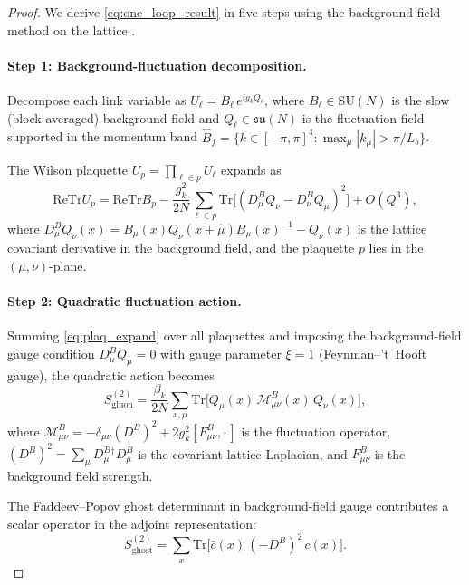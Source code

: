 \documentclass[11pt,a4paper]{amsart}
\theoremstyle{definition}
\newcommand{\SU}{\mathrm{SU}}
\newcommand{\su}{\mathfrak{su}}
\newcommand{\re}{\mathrm{Re}}
\newcommand{\Tr}{\mathrm{Tr}}
\begin{document}
\begin{proof}
We derive \eqref{eq:one_loop_result} in five steps using the background-field
method on the lattice \cite{Abbott81}.

\paragraph{Step 1: Background-fluctuation decomposition.}
Decompose each link variable as $U_\ell = B_\ell\, e^{ig_k Q_\ell}$, where
$B_\ell \in \SU(N)$ is the slow (block-averaged) background field and
$Q_\ell \in \su(N)$ is the fluctuation field supported in the
momentum band $\hat{B}_f = \{k\in[-\pi,\pi]^4 : \max_\mu |k_\mu| > \pi/L_b\}$.

The Wilson plaquette $U_p = \prod_{\ell\in p} U_\ell$ expands as
\begin{equation}\label{eq:plaq_expand}
  \re\Tr U_p = \re\Tr B_p
  - \frac{g_k^2}{2N}\sum_{\ell\in p}
    \Tr\!\bigl[(D^B_\mu Q_\nu - D^B_\nu Q_\mu)^2\bigr]
  + O(Q^3),
\end{equation}
where $D^B_\mu Q_\nu(x) = B_\mu(x) Q_\nu(x+\hat\mu) B_\mu(x)^{-1} - Q_\nu(x)$
is the lattice covariant derivative in the background field, and the plaquette
$p$ lies in the $(\mu,\nu)$-plane.

\paragraph{Step 2: Quadratic fluctuation action.}
Summing \eqref{eq:plaq_expand} over all plaquettes and imposing the
background-field gauge condition $D^B_\mu Q_\mu = 0$ with gauge parameter
$\xi = 1$ (Feynman--'t~Hooft gauge), the quadratic action becomes
\begin{equation}\label{eq:S2_gluon}
  S^{(2)}_{\mathrm{gluon}} = \frac{\beta_k}{2N}\sum_{x,\mu}
  \Tr\bigl[Q_\mu(x)\,\mathcal{M}^B_{\mu\nu}(x)\,Q_\nu(x)\bigr],
\end{equation}
where $\mathcal{M}^B_{\mu\nu} = -\delta_{\mu\nu}(D^B)^2 + 2g_k^2 [F^B_{\mu\nu},\cdot\,]$
is the fluctuation operator, $(D^B)^2 = \sum_\mu D^B_\mu{}^\dagger D^B_\mu$
is the covariant lattice Laplacian, and $F^B_{\mu\nu}$ is the
background field strength.

The Faddeev--Popov ghost determinant in background-field gauge contributes
a scalar operator in the adjoint representation:
\begin{equation}\label{eq:S2_ghost}
  S^{(2)}_{\mathrm{ghost}} = \sum_x \Tr\bigl[\bar c(x)\,(-D^B)^2\,c(x)\bigr].
\end{equation}


\end{proof}
\end{document}
